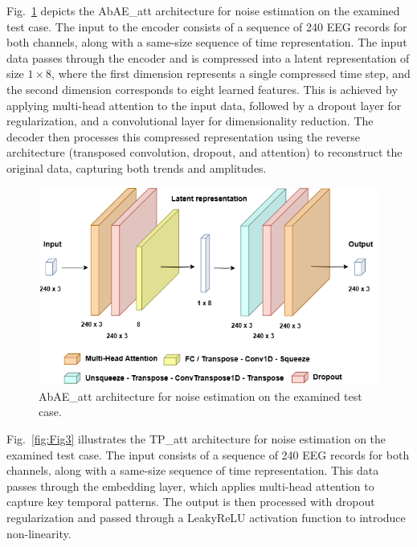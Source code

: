 \documentclass[conference]{IEEEtran}
\begin{document}
Fig.~\ref{fig:Fig2} depicts the AbAE\_att architecture for noise estimation on the examined test case. The input to the encoder consists of a sequence of 240 EEG records for both channels, along with a same-size sequence of time representation. The input data passes through the encoder and is compressed into a latent representation of size \( 1 \times 8 \), where the first dimension represents a single compressed time step, and the second dimension corresponds to eight learned features. This is achieved by applying multi-head attention to the input data, followed by a dropout layer for regularization, and a convolutional layer for dimensionality reduction. The decoder then processes this compressed representation using the reverse architecture (transposed convolution, dropout, and attention) to reconstruct the original data, capturing both trends and amplitudes.

\begin{figure}
    \centering
    \includegraphics[width=1\columnwidth]{images/Fig2.png}  
    \caption{\label{fig:Fig2} AbAE\_att architecture for noise estimation on the examined test case.}
\end{figure}

Fig.~\ref{fig:Fig3} illustrates the TP\_att architecture for noise estimation on the examined test case. The input consists of a sequence of 240 EEG records for both channels, along with a same-size sequence of time representation. This data passes through the embedding layer, which applies multi-head attention to capture key temporal patterns. The output is then processed with dropout regularization and passed through a LeakyReLU activation function to introduce non-linearity.
\end{document}
